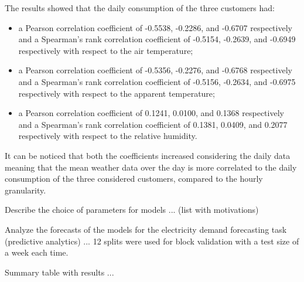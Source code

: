 The results showed that the daily consumption of the three customers had:
\begin{itemize}
  \item a Pearson correlation coefficient of -0.5538, -0.2286, and -0.6707 respectively and a Spearman's rank correlation coefficient of -0.5154, -0.2639, and -0.6949 respectively with respect to the air temperature;
  \item a Pearson correlation coefficient of -0.5356, -0.2276, and -0.6768 respectively and a Spearman's rank correlation coefficient of -0.5156, -0.2634, and -0.6975 respectively with respect to the apparent temperature;
  \item a Pearson correlation coefficient of 0.1241, 0.0100, and 0.1368 respectively and a Spearman's rank correlation coefficient of 0.1381, 0.0409, and 0.2077 respectively with respect to the relative humidity.
\end{itemize}
It can be noticed that both the coefficients increased considering the daily data meaning that the mean weather data over the day is more correlated to the daily consumption of the three considered customers, compared to the hourly granularity.




Describe the choice of parameters for models ... (list with motivations)

Analyze the forecasts of the models for the electricity demand forecasting task (predictive analytics) ...
12 splits were used for block validation with a test size of a week each time.

Summary table with results ...
